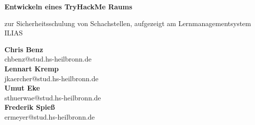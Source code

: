 \documentclass[10pt, a4paper,onecolumn ,titlepage]{article}
\begin{document}
    \begin{titlepage}
        \begin{center}

            \vspace*{1cm}

            {\large \textbf{Entwickeln eines TryHackMe Raums}}

            \vspace{0.5cm}
            zur Sicherheitsschulung von Schachstellen, aufgezeigt am Lernmanagementsystem ILIAS

            \vspace{1.5cm}

            \textbf{Chris Benz} \\
            \small{chbenz@stud.hs-heilbronn.de}
            \\
            \vspace{0.2cm}
            \textbf{Lennart Kremp}\\
            \small{jkaercher@stud.hs-heilbronn.de}
            \\
            \vspace{0.2cm}
            \textbf{Umut Eke} \\
            \small{sthuerwae@stud.hs-heilbronn.de}
            \\
            \vspace{0.2cm}
            \textbf{Frederik Spieß}\\
            \small{ermeyer@stud.hs-heilbronn.de}


            \vfill


\end{center}
\end{titlepage}
\end{document}
